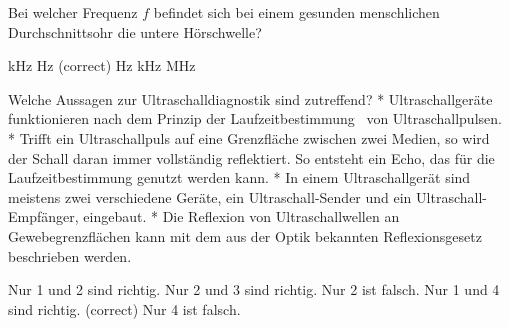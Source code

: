 \documentclass[11pt]{exam}
\begin{document}
\begin{questions}
\vspace{3mm}\question Bei welcher Frequenz \( f \) befindet sich bei einem gesunden menschlichen Durchschnittsohr die untere Hörschwelle?

\begin{choices}
	 kHz
	 Hz (correct)
	 Hz
	 kHz
	 MHz
\end{choices}

\vspace{3mm}\question Welche Aussagen zur Ultraschalldiagnostik sind zutreffend?	* Ultraschallgeräte funktionieren nach dem Prinzip der Laufzeitbestimmung  von Ultraschallpulsen.	* Trifft ein Ultraschallpuls auf eine Grenzfläche zwischen zwei Medien, so wird der Schall daran immer vollständig reflektiert. So entsteht ein Echo, das für die Laufzeitbestimmung genutzt werden kann.	* In einem Ultraschallgerät sind meistens zwei verschiedene Geräte, ein Ultraschall-Sender und ein Ultraschall-Empfänger, eingebaut.	* Die Reflexion von Ultraschallwellen an Gewebegrenzflächen kann mit dem aus der Optik bekannten Reflexionsgesetz beschrieben werden.

\begin{choices}
	\choice Nur 1 und 2 sind richtig.
	\choice Nur 2 und 3 sind richtig.
	\choice Nur 2 ist falsch.
	\choice Nur 1 und 4 sind richtig. (correct)
	\choice Nur 4 ist falsch.
\end{choices}

\vspace{3mm}\end{questions}
\end{document}
